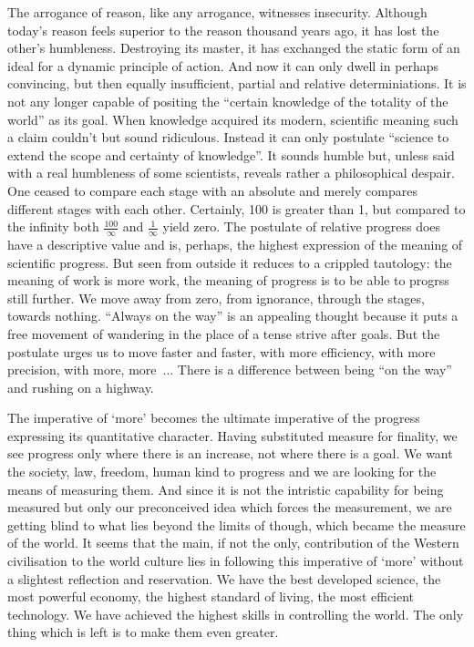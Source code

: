 The arrogance of reason, like any arrogance, witnesses insecurity.
Although today's reason feels superior to the reason thousand years ago,
it has lost the other's humbleness. Destroying its master, it has exchanged
the static form of an ideal for a dynamic principle of action. And now it can
only dwell in perhaps convincing, but then equally insufficient, partial and
relative determiniations. It is not any longer capable of positing the 
``certain knowledge of the totality of the world'' as its goal. 
When knowledge acquired its modern, scientific meaning such a claim couldn't 
but sound ridiculous. Instead it
can only postulate ``science to extend the scope and certainty of knowledge''.
It sounds humble but, unless said with a real humbleness of some scientists,
reveals rather a philosophical despair. One ceased to compare each stage 
with an absolute and merely compares different stages with each other.
Certainly, 100 is greater than 1, but compared to the infinity both 
$\frac{100}{\infty}$ and $\frac{1}{\infty}$ yield zero. The postulate of relative
progress does have a descriptive value and is, perhaps, the highest expression
of the meaning of scientific progress. But seen from
outside it reduces to a crippled tautology: the meaning of work is more work, the
meaning of progress is to be able to progrss still further. We move away from
zero, from ignorance, through the stages, towards nothing. ``Always on the 
way'' is an appealing thought because it puts a free movement of wandering in
the place of a tense strive after goals. But the postulate urges us to move
faster and faster, with more efficiency, with more precision, with more, 
more~... There is a difference between being ``on the way'' and rushing on a 
highway.

The imperative of `more' becomes the ultimate imperative of the progress
expressing its quantitative character. Having substituted measure for finality,
we see progress only where there is an increase, not where there is a goal. 
We want the society,
law, freedom, human kind to progress and we are looking for the means of 
measuring them. And since it is not the intristic capability for being measured
but only our preconceived idea which forces the measurement, we
are getting blind to what lies beyond the limits of though, which became
the measure of the world.
It seems that the main, if not the only, contribution of the Western civilisation 
to the world culture lies in following this imperative of `more' without
a slightest reflection and reservation. We have the best developed science,
the most powerful economy, the highest standard of living, the most efficient
technology. We have achieved the highest skills in controlling the world. The
only thing which is left is to make them even greater.

